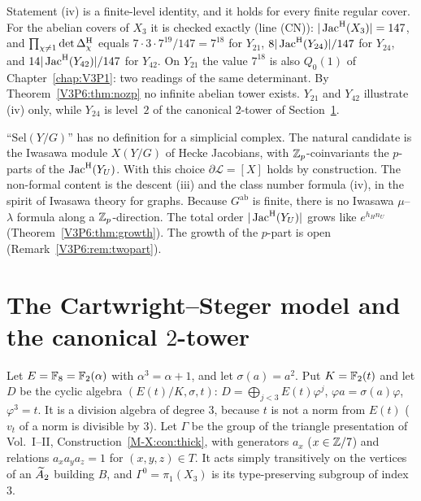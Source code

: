 \begin{remark}\label{V3P6:rem:check}
Statement (iv) is a finite-level identity, and it holds for every finite regular cover. For the
abelian covers of $X_3$ it is checked exactly (line (CN)):
$|\operatorname{Jac}^{\mathrm{H}}(X_3)|=147$, and $\prod_{\chi\ne1}\det\Delta^{\mathrm{H}}_\chi$ equals
$7\cdot3\cdot7^{19}/147=7^{18}$ for $Y_{21}$, $8|\operatorname{Jac}^{\mathrm{H}}(Y_{24})|/147$ for $Y_{24}$, and
$14|\operatorname{Jac}^{\mathrm{H}}(Y_{42})|/147$ for $Y_{42}$. On $Y_{21}$ the value $7^{18}$ is also $Q_0(1)$ of
Chapter~\ref{chap:V3P1}: two readings of the same determinant. By Theorem~\ref{V3P6:thm:nozp} no infinite
abelian tower exists. $Y_{21}$ and $Y_{42}$ illustrate (iv) only, while $Y_{24}$ is level~$2$
of the canonical $2$-tower of Section~\ref{V3P6:sec:cs}.
\end{remark}

\begin{remark}\label{V3P6:rem:selmer}
``$\mathrm{Sel}(Y/G)$'' has no definition for a simplicial complex. The natural candidate is the
Iwasawa module $X(Y/G)$ of Hecke Jacobians, with $\mathbb{Z}_p$-coinvariants the $p$-parts of the
$\operatorname{Jac}^{\mathrm{H}}(Y_U)$. With this choice $\partial\mathcal L=[X]$ holds by construction. The non-formal
content is the descent (iii) and the class number formula (iv), in the spirit of Iwasawa theory
for graphs. Because $G^{\mathrm{ab}}$ is finite, there is no Iwasawa $\mu$--$\lambda$ formula
along a $\mathbb{Z}_p$-direction. The total order $|\operatorname{Jac}^{\mathrm{H}}(Y_U)|$ grows like $e^{h_Hn_U}$
(Theorem~\ref{V3P6:thm:growth}). The growth of the $p$-part is open
(Remark~\ref{V3P6:rem:twopart}).
\end{remark}

\section{The Cartwright--Steger model and the canonical \texorpdfstring{$2$}{2}-tower}\label{V3P6:sec:cs}

Let $E=\mathbb{F}_8=\mathbb{F}_2(\alpha)$ with $\alpha^{3}=\alpha+1$, and let $\sigma(a)=a^{2}$. Put $K=\mathbb{F}_2(t)$ and
let $D$ be the cyclic algebra $(E(t)/K,\sigma,t)$:
$D=\bigoplus_{j<3}E(t)\varphi^{j}$, $\varphi a=\sigma(a)\varphi$, $\varphi^{3}=t$. It is a division
algebra of degree $3$, because $t$ is not a norm from $E(t)$ ($v_t$ of a norm is divisible by $3$).
Let $\Gamma$ be the group of the triangle presentation of Vol.~I--II,
Construction~\ref{M-X:con:thick}, with generators $a_x$ ($x\in\mathbb{Z}/7$) and relations $a_xa_ya_z=1$
for $(x,y,z)\in T$. It acts simply transitively on the vertices of an $\widetilde A_2$ building $B$, and
$\Gamma^{0}=\pi_1(X_3)$ is its type-preserving subgroup of index $3$.

